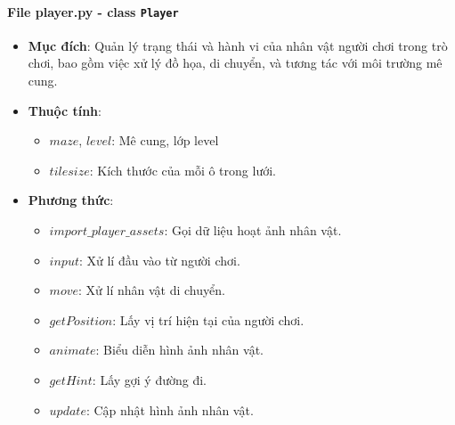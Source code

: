 \paragraph{File player.py - class \texttt{Player}}
\begin{itemize}
    \item \textbf{Mục đích}: Quản lý trạng thái và hành vi của nhân vật người chơi trong trò chơi, bao gồm việc xử lý đồ họa, di chuyển, và tương tác với môi trường mê cung.
    \item \textbf{Thuộc tính}:
        \begin{itemize}
            \item $maze$, $level$: Mê cung, lớp level
            \item $tilesize$: Kích thước của mỗi ô trong lưới.
        \end{itemize}
    \item \textbf{Phương thức}:
        \begin{itemize}
            \item $import\_player\_assets$: Gọi dữ liệu hoạt ảnh nhân vật.
            \item $input$: Xử lí đầu vào từ người chơi.
            \item $move$: Xử lí nhân vật di chuyển.
            \item $getPosition$: Lấy vị trí hiện tại của người chơi.
            \item $animate$: Biểu diễn hình ảnh nhân vật.
            \item $getHint$: Lấy gợi ý đường đi.
            \item $update$: Cập nhật hình ảnh nhân vật.
        \end{itemize}
\end{itemize}

